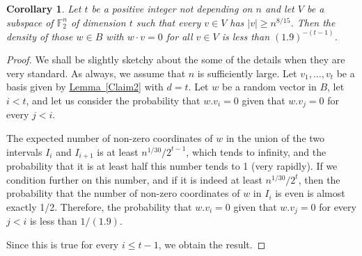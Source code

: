 \documentclass[11pt]{article}
\numberwithin{equation}{section}
\newtheorem{corollary}[theorem]{Corollary}
\theoremstyle{definition}
\theoremstyle{plain}
\newcommand{\expref}[2]{\hyperref[#2]{#1~\ref{#2}}}
\begin{document}
\begin{corollary}\label{Claim1} Let $t$ be a positive integer not depending on $n$ and let $V$ be a subspace of $\mathbb{F}_2^n$ of dimension $t$ such that every $v\in V$ has $|v|\geq n^{8/15}$. Then the density of those $w\in B$ with $w\cdot v=0$ for all $v\in V$ is less than $(1.9)^{-(t-1)}$.
\end{corollary}

\begin{proof}
	We shall be slightly sketchy about the some of the details when they are very standard. As always, we assume that $n$ is sufficiently large. Let $v_1,\dots,v_t$ be a basis given by \expref{Lemma}{Claim2} with $d=t$. Let $w$ be a random vector in $B$, let $i<t$, and let us consider the probability that $w.v_i=0$ given that $w.v_j=0$ for every $j<i$. 
	
	The expected number of non-zero coordinates of $w$ in the union of the two intervals $I_i$ and $I_{i+1}$ is at least $n^{1/30}/2^{t-1}$, which tends to infinity, and the probability that it is at least half this number tends to 1 (very rapidly). If we condition further on this number, and if it is indeed at least $n^{1/30}/2^t$, then the probability that the number of non-zero coordinates of $w$ in $I_i$ is even is almost exactly 1/2. Therefore,  the probability that $w.v_i=0$ given that $w.v_j=0$ for every $j<i$ is less than $1/(1.9)$. 
	
	Since this is true for every $i\leq t-1$, we obtain the result. 
\end{proof}
\end{document}
